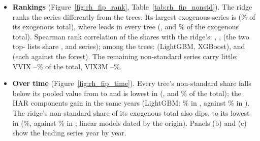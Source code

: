 \begin{itemize}
\begin{itemize}
    shares, response shapes and interactions: Appendices~\ref{app:rh_fi_cond} and~\ref{app:rh_fi_shapes}.
  \end{itemize}
\item \textbf{Rankings} (Figure~\ref{fig:rh_fip_rank}, Table~\ref{tab:rh_fip_nonstd}). The ridge ranks the series
  differently from the trees. Its largest exogenous series is \rhfipRidgeTopOne{} (\rhfipRidgeTopOneEx\% of its
  exogenous total), where \rhfipTreeTopOne{} leads in every tree (\rhfipLgbmTopOneEx, \rhfipXgbTopOneEx{} and
  \rhfipRfTopOneEx\% of the exogenous total). Spearman rank correlation of the \rhfipNExog{} shares with the ridge's:
  \rhfipLgbmSpRidge, \rhfipXgbSpRidge, \rhfipRfSpRidge{} (the two top-\rhfipTopN{} lists share \rhfipLgbmTopRidge,
  \rhfipXgbTopRidge{} and \rhfipRfTopRidge{} series); among the trees: \rhfipSpLgbmXgb{} (LightGBM, XGBoost),
  \rhfipSpLgbmRf{} and \rhfipSpXgbRf{} (each against the forest). The remaining non-standard series carry little:
  VVIX \rhfipVvixMin--\rhfipVvixMax\% of the total, VIX3M \rhfipVixThreeMMin--\rhfipVixThreeMMax\%.
\item \textbf{Over time} (Figure~\ref{fig:rh_fip_time}). Every tree's non-standard share falls below its pooled value
  from \rhfipDipFirst{} to \rhfipDipLast{} and is lowest in \rhfipNsYearMinYr{} (\rhfipLgbmNsYearMin,
  \rhfipXgbNsYearMin{} and \rhfipRfNsYearMin\% of the total); the HAR components gain in the same years (LightGBM:
  \rhfipLgbmHarYearMax\% in \rhfipLgbmHarYearMaxYr, against \rhfipLgbmHarYearMin\% in \rhfipLgbmHarYearMinYr). The
  ridge's non-standard share of its exogenous total also dips, to its lowest in \rhfipRidgeNsExYearMinYr{}
  (\rhfipRidgeNsExYearMin\%, against \rhfipRidgeNsExYearMax\% in \rhfipRidgeNsExYearMaxYr; linear models dated by
  the origin). Panels (b) and (c) show the leading series year by year.
\end{itemize}





